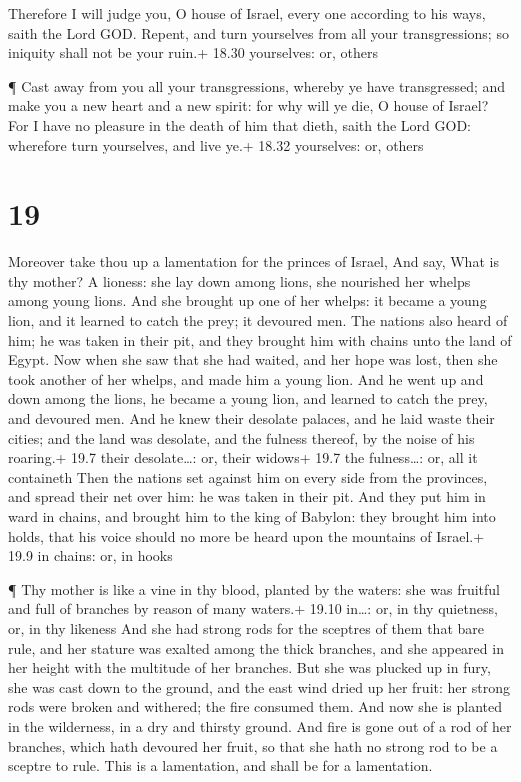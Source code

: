  Therefore I will judge you, O house of Israel, every one
according to his ways, saith the Lord GOD. Repent, and turn yourselves
from all your transgressions; so iniquity shall not be your ruin.+ 18.30
yourselves: or, others

 ¶ Cast away from you all your transgressions, whereby ye
have transgressed; and make you a new heart and a new spirit: for why
will ye die, O house of Israel?  For I have no pleasure in
the death of him that dieth, saith the Lord GOD: wherefore turn
yourselves, and live ye.+ 18.32 yourselves: or, others

\hypertarget{section-18}{%
\section{19}\label{section-18}}

 Moreover take thou up a lamentation for the princes of
Israel,  And say, What is thy mother? A lioness: she lay
down among lions, she nourished her whelps among young lions.
 And she brought up one of her whelps: it became a young
lion, and it learned to catch the prey; it devoured men. 
The nations also heard of him; he was taken in their pit, and they
brought him with chains unto the land of Egypt.  Now when
she saw that she had waited, and her hope was lost, then she took
another of her whelps, and made him a young lion.  And he
went up and down among the lions, he became a young lion, and learned to
catch the prey, and devoured men.  And he knew their
desolate palaces, and he laid waste their cities; and the land was
desolate, and the fulness thereof, by the noise of his roaring.+ 19.7
their desolate\ldots: or, their widows+ 19.7 the fulness\ldots: or, all
it containeth  Then the nations set against him on every
side from the provinces, and spread their net over him: he was taken in
their pit.  And they put him in ward in chains, and brought
him to the king of Babylon: they brought him into holds, that his voice
should no more be heard upon the mountains of Israel.+ 19.9 in chains:
or, in hooks

 ¶ Thy mother is like a vine in thy blood, planted by the
waters: she was fruitful and full of branches by reason of many waters.+
19.10 in\ldots: or, in thy quietness, or, in thy likeness 
And she had strong rods for the sceptres of them that bare rule, and her
stature was exalted among the thick branches, and she appeared in her
height with the multitude of her branches.  But she was
plucked up in fury, she was cast down to the ground, and the east wind
dried up her fruit: her strong rods were broken and withered; the fire
consumed them.  And now she is planted in the wilderness,
in a dry and thirsty ground.  And fire is gone out of a rod
of her branches, which hath devoured her fruit, so that she hath no
strong rod to be a sceptre to rule. This is a lamentation, and shall be
for a lamentation.

